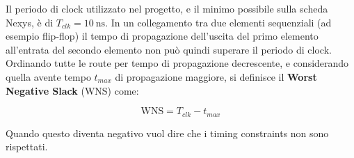 Il periodo di clock utilizzato nel progetto, e il minimo possibile sulla
scheda Nexys, è di $T_{clk} = \SI{10}{\nano\second}$.
In un collegamento tra due elementi sequenziali (ad esempio flip-flop)
il tempo di propagazione dell'uscita del primo elemento all'entrata del
secondo elemento non può quindi superare il periodo di clock.
Ordinando tutte le route per tempo di propagazione decrescente, e
considerando quella avente tempo $t_{max}$ di propagazione maggiore, si definisce
il \textbf{Worst Negative Slack} (WNS) come:

\[
\textrm{WNS} = T_{clk} - t_{max}
\] 

Quando questo diventa negativo vuol dire che i timing constraints non
sono rispettati. 
